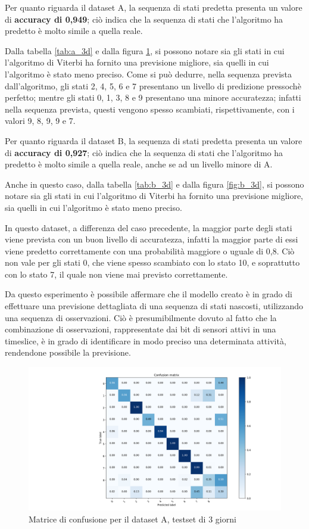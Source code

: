 \documentclass[10pt,a4paper]{article}
\begin{document}
    Per quanto riguarda il dataset A, la sequenza di stati predetta presenta un valore di \textbf{accuracy di 0,949}; ciò indica che la sequenza di stati che l'algoritmo ha predetto è molto simile a quella reale.
    
    Dalla tabella \ref{tab:a_3d} e dalla figura \ref{fig:a_3d}, si possono notare sia gli stati in cui l'algoritmo di Viterbi ha fornito una previsione migliore, sia quelli in cui l'algoritmo è stato meno preciso. Come si può dedurre, nella sequenza prevista dall'algoritmo, gli stati 2, 4, 5, 6 e 7 presentano un livello di predizione pressochè perfetto; mentre gli stati 0, 1, 3, 8 e 9 presentano una minore accuratezza; infatti nella sequenza prevista, questi vengono spesso scambiati, rispettivamente, con i valori 9, 8, 9, 9 e 7.
    
    Per quanto riguarda il dataset B, la sequenza di stati predetta presenta un valore di \textbf{accuracy di 0,927}; ciò indica che la sequenza di stati che l'algoritmo ha predetto è molto simile a quella reale, anche se ad un livello minore di A.
    
    Anche in questo caso, dalla tabella \ref{tab:b_3d} e dalla figura \ref{fig:b_3d}, si possono notare sia gli stati in cui l'algoritmo di Viterbi ha fornito una previsione migliore, sia quelli in cui l'algoritmo è stato meno preciso.
    
    In questo dataset, a differenza del caso precedente, la maggior parte degli stati viene prevista con un buon livello di accuratezza, infatti la maggior parte di essi viene predetto correttamente con una probabilità maggiore o uguale di 0,8. Ciò non vale per gli stati 0, che viene spesso scambiato con lo stato 10, e soprattutto con lo stato 7, il quale non viene mai previsto correttamente.
    
    Da questo esperimento è possibile affermare che il modello creato è in grado di effettuare una previsione dettagliata di una sequenza di stati nascosti, utilizzando una sequenza di osservazioni. Ciò è presumibilmente dovuto al fatto che la combinazione di osservazioni, rappresentate dai bit di sensori attivi in una timeslice, è in grado di identificare in modo preciso una determinata attività, rendendone possibile la previsione.

	\begin{figure}[!htbp]
	\includegraphics[width=\linewidth]{immagini/confusion_matrix/a_3d.png}
	\caption{Matrice di confusione per il dataset A, testset di 3 giorni}
	\label{fig:a_3d}
	\end{figure}
	
\end{document}
